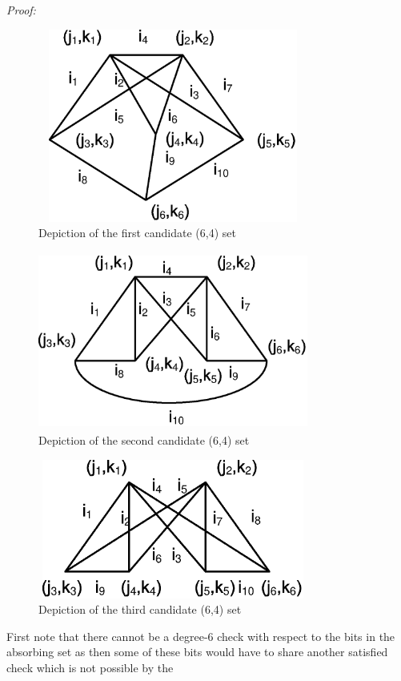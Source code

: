 \noindent \textit{Proof:}
\begin{figure}[ht]
\center\includegraphics[width=3.5in,height=2.5in]{Drawing641_1.eps}
\caption{Depiction of the first candidate (6,4) set} \label{fig64a}
\end{figure}
\begin{figure}[ht]
\center
\includegraphics[width=3.5in,height=2.3in]{Drawing642_2.eps}
\caption{Depiction of the second candidate (6,4) set} \label{fig64b}
\end{figure}
\begin{figure}[ht]
\center\includegraphics[width=3.5in,height=1.8in]{Drawing643_1.eps}
\caption{Depiction of the third candidate (6,4) set} \label{fig64c}
\end{figure}
First note that there cannot be a degree-6 check with respect to
the bits in the absorbing set as then some of these bits would
have to share another satisfied check which is not possible by the
